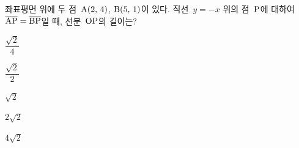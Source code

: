 좌표평면 위에 두 점~$\mathrm{A}(2,\mkern3mu 4)$, $\mathrm{B}(5,\mkern3mu 1)$이 있다. 직선~$y=-x$ 위의 점~$\mathrm{P}$에 대하여 $\overline{\mathrm{AP}}=\overline{\mathrm{BP}}$일 때, 선분~$\mathrm{OP}$의 길이는? 
\begin{choices32}{\rule[-3ex]{0pt}{8ex}$\dfrac{\sqrt{2}}{4}$}{\rule[-3ex]{0pt}{8ex}$\dfrac{\sqrt{2}}{2}$}{\rule[-3ex]{0pt}{8ex}$\sqrt{2}$}{\rule[-3ex]{0pt}{8ex}$2\sqrt{2}$}{\rule[-3ex]{0pt}{8ex}$4\sqrt{2}$}\end{choices32}
